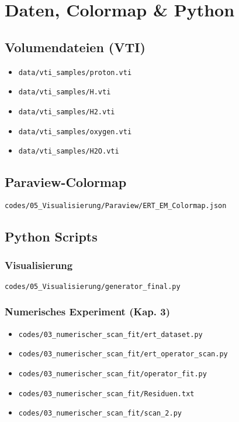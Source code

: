 \chapter{Daten, Colormap \& Python}
\section{Volumendateien (VTI)}
\begin{itemize}
  \item \texttt{data/vti\_samples/proton.vti}
  \item \texttt{data/vti\_samples/H.vti}
  \item \texttt{data/vti\_samples/H2.vti}
  \item \texttt{data/vti\_samples/oxygen.vti}
  \item \texttt{data/vti\_samples/H2O.vti}
\end{itemize}

\section{Paraview-Colormap}
\texttt{codes/05\_Visualisierung/Paraview/ERT\_EM\_Colormap.json}

\section{Python Scripts}

\subsection{Visualisierung}

\texttt{codes/05\_Visualisierung/generator\_final.py}

\subsection{Numerisches Experiment (Kap. 3)}
\begin{itemize}
  \item \texttt{codes/03\_numerischer\_scan\_fit/ert\_dataset.py}
  \item \texttt{codes/03\_numerischer\_scan\_fit/ert\_operator\_scan.py}
  \item \texttt{codes/03\_numerischer\_scan\_fit/operator\_fit.py}
  \item \texttt{codes/03\_numerischer\_scan\_fit/Residuen.txt}
  \item \texttt{codes/03\_numerischer\_scan\_fit/scan\_2.py}
\end{itemize}